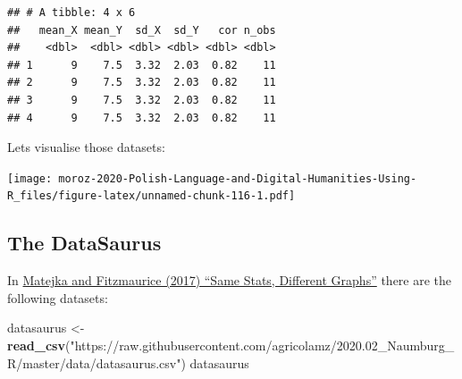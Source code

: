 \documentclass[
]{book}
\newenvironment{Shaded}{\begin{snugshade}}{\end{snugshade}}
\newcommand{\DataTypeTok}[1]{\textcolor[rgb]{0.13,0.29,0.53}{#1}}
\newcommand{\DecValTok}[1]{\textcolor[rgb]{0.00,0.00,0.81}{#1}}
\newcommand{\KeywordTok}[1]{\textcolor[rgb]{0.13,0.29,0.53}{\textbf{#1}}}
\newcommand{\NormalTok}[1]{#1}
\newcommand{\OperatorTok}[1]{\textcolor[rgb]{0.81,0.36,0.00}{\textbf{#1}}}
\newcommand{\StringTok}[1]{\textcolor[rgb]{0.31,0.60,0.02}{#1}}
\begin{document}
\begin{Shaded}
\end{Shaded}

\begin{verbatim}
## # A tibble: 4 x 6
##   mean_X mean_Y  sd_X  sd_Y   cor n_obs
##    <dbl>  <dbl> <dbl> <dbl> <dbl> <dbl>
## 1      9    7.5  3.32  2.03  0.82    11
## 2      9    7.5  3.32  2.03  0.82    11
## 3      9    7.5  3.32  2.03  0.82    11
## 4      9    7.5  3.32  2.03  0.82    11
\end{verbatim}

Lets visualise those datasets:

\texttt{[image: moroz-2020-Polish-Language-and-Digital-Humanities-Using-R\_files/figure-latex/unnamed-chunk-116-1.pdf]}

\hypertarget{the-datasaurus}{%
\subsection{The DataSaurus}\label{the-datasaurus}}

In \href{https://www.autodeskresearch.com/sites/default/files/SameStats-DifferentGraphs.pdf}{Matejka and Fitzmaurice (2017) ``Same Stats, Different Graphs''} there are the following datasets:

\begin{Shaded}
\begin{Highlighting}[]
\NormalTok{datasaurus <-}\StringTok{ }\KeywordTok{read_csv}\NormalTok{(}\StringTok{"https://raw.githubusercontent.com/agricolamz/2020.02_Naumburg_R/master/data/datasaurus.csv"}\NormalTok{)}
\NormalTok{datasaurus}
\end{Highlighting}
\end{Shaded}
\end{document}
